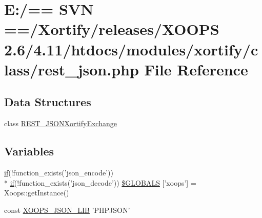 \hypertarget{rest__json_8php}{\section{E\-:/== S\-V\-N ==/\-Xortify/releases/\-X\-O\-O\-P\-S 2.6/4.11/htdocs/modules/xortify/class/rest\-\_\-json.php File Reference}
\label{rest__json_8php}
}
\subsection*{Data Structures}
\begin{DoxyCompactItemize}
\item 
class \hyperlink{class_r_e_s_t___j_s_o_n_xortify_exchange}{R\-E\-S\-T\-\_\-\-J\-S\-O\-N\-Xortify\-Exchange}
\end{DoxyCompactItemize}
\subsection*{Variables}
\begin{DoxyCompactItemize}
\item 
\hyperlink{poll_2index_8php_ae404acbb304be6b6ac443de921697faf}{if}(!function\-\_\-exists('json\-\_\-encode')) \\*
\hyperlink{poll_2index_8php_ae404acbb304be6b6ac443de921697faf}{if}(!function\-\_\-exists('json\-\_\-decode')) \hyperlink{rest__json_8php_ab990bf70b4d23779b5e44c6ad5cbdf5d}{\$\-G\-L\-O\-B\-A\-L\-S} \mbox{[}'xoops'\mbox{]} = Xoops\-::get\-Instance()
\item 
const \hyperlink{rest__json_8php_a42fbc26b113afc08a5757bacf456cd8a}{X\-O\-O\-P\-S\-\_\-\-J\-S\-O\-N\-\_\-\-L\-I\-B} 'P\-H\-P\-J\-S\-O\-N'
\end{DoxyCompactItemize}


